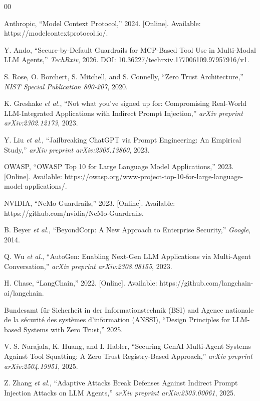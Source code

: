 \documentclass[conference]{IEEEtran}
\begin{document}
\balance
\begin{thebibliography}{00}
\raggedright

 Anthropic, ``Model Context Protocol,'' 2024. [Online]. Available: https://modelcontextprotocol.io/.

 Y. Ando, ``Secure-by-Default Guardrails for MCP-Based Tool Use in Multi-Modal LLM Agents,'' \textit{TechRxiv}, 2026. DOI: 10.36227/techrxiv.177006109.97957916/v1.

 S. Rose, O. Borchert, S. Mitchell, and S. Connelly, ``Zero Trust Architecture,'' \textit{NIST Special Publication 800-207}, 2020.

 K. Greshake \textit{et al.}, ``Not what you've signed up for: Compromising Real-World LLM-Integrated Applications with Indirect Prompt Injection,'' \textit{arXiv preprint arXiv:2302.12173}, 2023.

 Y. Liu \textit{et al.}, ``Jailbreaking ChatGPT via Prompt Engineering: An Empirical Study,'' \textit{arXiv preprint arXiv:2305.13860}, 2023.

 OWASP, ``OWASP Top 10 for Large Language Model Applications,'' 2023. [Online]. Available: https://owasp.org/www-project-top-10-for-large-language-model-applications/.

 NVIDIA, ``NeMo Guardrails,'' 2023. [Online]. Available: https://github.com/nvidia/NeMo-Guardrails.

 B. Beyer \textit{et al.}, ``BeyondCorp: A New Approach to Enterprise Security,'' \textit{Google}, 2014.

 Q. Wu \textit{et al.}, ``AutoGen: Enabling Next-Gen LLM Applications via Multi-Agent Conversation,'' \textit{arXiv preprint arXiv:2308.08155}, 2023.

 H. Chase, ``LangChain,'' 2022. [Online]. Available: https://github.com/langchain-ai/langchain.

 Bundesamt für Sicherheit in der Informationstechnik (BSI) and Agence nationale de la sécurité des systèmes d'information (ANSSI), ``Design Principles for LLM-based Systems with Zero Trust,'' 2025.

 V. S. Narajala, K. Huang, and I. Habler, ``Securing GenAI Multi-Agent Systems Against Tool Squatting: A Zero Trust Registry-Based Approach,'' \textit{arXiv preprint arXiv:2504.19951}, 2025.

 Z. Zhang \textit{et al.}, ``Adaptive Attacks Break Defenses Against Indirect Prompt Injection Attacks on LLM Agents,'' \textit{arXiv preprint arXiv:2503.00061}, 2025.

\end{thebibliography}
\end{document}
